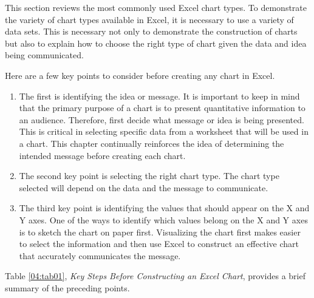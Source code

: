 This section reviews the most commonly used Excel chart types. To demonstrate the variety of chart types available in Excel, it is necessary to use a variety of data sets. This is necessary not only to demonstrate the construction of charts but also to explain how to choose the right type of chart given the data and idea being communicated.

Here are a few key points to consider before creating any chart in Excel.

\begin{enumerate}
	\item The first is identifying the idea or message. It is important to keep in mind that the primary purpose of a chart is to present quantitative information to an audience. Therefore, first decide what message or idea is being presented. This is critical in selecting specific data from a worksheet that will be used in a chart. This chapter continually reinforces the idea of determining the intended message before creating each chart.
	\item The second key point is selecting the right chart type. The chart type selected will depend on the data and the message to communicate.
	\item The third key point is identifying the values that should appear on the X and Y axes. One of the ways to identify which values belong on the X and Y axes is to sketch the chart on paper first. Visualizing the chart first makes easier to select the information and then use Excel to construct an effective chart that accurately communicates the message. 
\end{enumerate}

Table \ref{04:tab01}, \textit{Key Steps Before Constructing an Excel Chart}, provides a brief summary of the preceding points.

